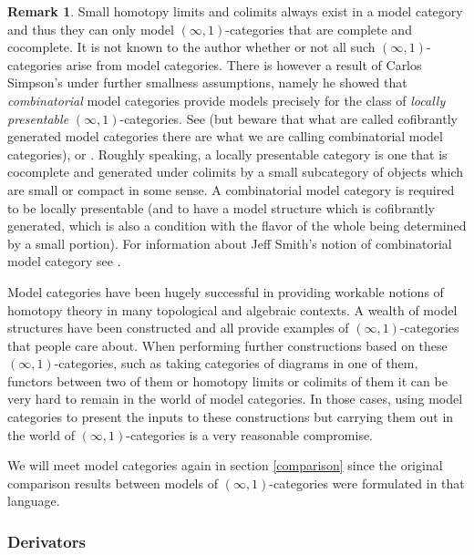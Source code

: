 \documentclass[12pt]{amsart}
\theoremstyle{definition} \newtheorem{definition}[theorem]{Definition}
\newtheorem{remark}[theorem]{Remark}
\numberwithin{equation}{section}
\newcommand{\oo}{\infty}
\newcommand{\io}{$(\oo,1)$}
\begin{document}
\begin{remark}
  Small homotopy limits and colimits always exist in a model category
  and thus they can only model \io-categories that are complete and
  cocomplete. It is not known to the author whether or not all such
  \io-categories arise from model categories. There is however a
  result of Carlos Simpson's under further smallness assumptions,
  namely he showed that \emph{combinatorial} model categories provide
  models precisely for the class of \emph{locally presentable}
  \io-categories.  See \cite{SimpsonPres} (but beware that what are
  called cofibrantly generated model categories there are what we are
  calling combinatorial model categories), or \cite[Section
  5.5.1]{HTT}. Roughly speaking, a locally presentable category is one
  that is cocomplete and generated under colimits by a small
  subcategory of objects which are small or compact in some sense. A
  combinatorial model category is required to be locally presentable
  (and to have a model structure which is cofibrantly generated, which
  is also a condition with the flavor of the whole being determined by
  a small portion). For information about Jeff Smith's notion of
  combinatorial model category see \cite[Appendix A.2.6]{HTT}.
\end{remark}

Model categories have been hugely successful in providing workable
notions of homotopy theory in many topological and algebraic contexts.
A wealth of model structures have been constructed and all provide
examples of \io-categories that people care about. When performing
further constructions based on these \io-categories, such as taking
categories of diagrams in one of them, functors between two of them or
homotopy limits or colimits of them it can be very hard to remain in
the world of model categories. In those cases, using model categories
to present the inputs to these constructions but carrying them out in
the world of \io-categories is a very reasonable compromise.

We will meet model categories again in section \ref{comparison} since
the original comparison results between models of \io-categories were
formulated in that language.

\subsubsection{Derivators}
\end{document}
